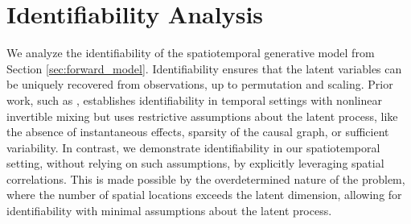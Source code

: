 \section{Identifiability Analysis}
\label{sec:identifiability}



We analyze the identifiability of the spatiotemporal generative model from Section \ref{sec:forward_model}. Identifiability ensures that the latent variables can be uniquely recovered from observations, up to permutation and scaling. Prior work, such as \citep{yao2021learning, yao2022temporally, lachapelle2024nonparametric}, establishes identifiability in temporal settings with nonlinear invertible mixing but uses restrictive assumptions about the latent process, like the absence of instantaneous effects, sparsity of the causal graph, or sufficient variability. In contrast, we demonstrate identifiability in our spatiotemporal setting,  without relying on such assumptions, by explicitly leveraging spatial correlations. This is made possible by the overdetermined nature of the problem, where the number of spatial locations exceeds the latent dimension, allowing for identifiability with minimal assumptions about the latent process.

